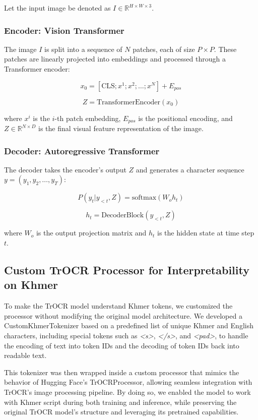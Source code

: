 {Let the input image be denoted as $I \in \mathbb{R}^{H \times W \times 3}$.

\subsubsection*{Encoder: Vision Transformer}

The image $I$ is split into a sequence of $N$ patches, each of size $P \times P$. 
These patches are linearly projected into embeddings and processed through a Transformer encoder:

\[
x_0 = [\text{CLS}; x^1; x^2; \dots; x^N] + E_{pos}
\]

\[
Z = \text{TransformerEncoder}(x_0)
\]

where $x^i$ is the $i$-th patch embedding, $E_{pos}$ is the 
positional encoding, and $Z \in \mathbb{R}^{N \times D}$ is the final visual 
feature representation of the image.

\subsubsection*{Decoder: Autoregressive Transformer}

The decoder takes the encoder's output $Z$ and generates a 
character sequence $y = (y_1, y_2, \dots, y_T)$:

\[
P(y_t | y_{<t}, Z) = \text{softmax}(W_o h_t)
\]

\[
h_t = \text{DecoderBlock}(y_{<t}, Z)
\]

where $W_o$ is the output projection matrix and $h_t$ is the hidden state at time step $t$.




\subsection{Custom TrOCR Processor for Interpretability on Khmer}
\label{subsec:trocr-customization}

To make the TrOCR model understand Khmer tokens, we customized the processor without modifying the original model architecture. We developed a CustomKhmerTokenizer based on a predefined list of unique Khmer and English characters, including special tokens such as \textit{<s>}, \textit{</s>}, and \textit{<pad>}, to handle the encoding of text into token IDs and the decoding of token IDs back into readable text.

This tokenizer was then wrapped inside a custom processor that mimics the behavior of Hugging Face's TrOCRProcessor, allowing seamless integration with TrOCR's image processing pipeline. By doing so, we enabled the model to work with Khmer script during both training and inference, while preserving the original TrOCR model's structure and leveraging its pretrained capabilities.

}
